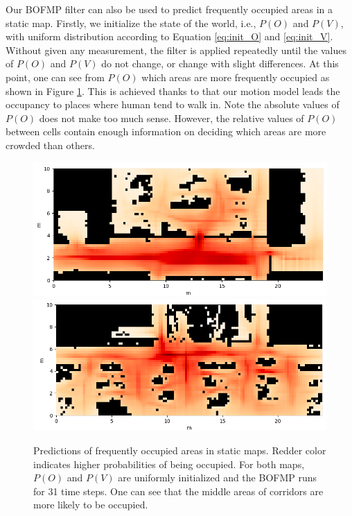 Our BOFMP filter can also be used to predict frequently occupied areas in a static map. Firstly, we initialize the state of the world, i.e., $P(O)$ and $P(V)$, with uniform distribution according to Equation \ref{eq:init_O} and \ref{eq:init_V}. Without given any measurement, the filter is applied repeatedly until the values of $P(O)$ and $P(V)$ do not change, or change with slight differences. At this point, one can see from $P(O)$ which areas are more frequently occupied as shown in Figure \ref{fig:average_occupancy_pred}. This is achieved thanks to that our motion model leads the occupancy to places where human tend to walk in. Note the absolute values of $P(O)$ does not make too much sense. However, the relative values of $P(O)$ between cells contain enough information on deciding which areas are more crowded than others. 

\begin{figure}[ht]
  \centering
    \includegraphics[width=\textwidth]{figures/average_occupancy_3.png} \\
    \includegraphics[width=\textwidth]{figures/average_occupancy_4.png} \\
    \caption[Predictions of frequently occupied areas in static maps.]{Predictions of frequently occupied areas in static maps. Redder color indicates higher probabilities of being occupied. For both maps, $P(O)$ and $P(V)$ are uniformly initialized and the BOFMP runs for 31 time steps. One can see that the middle areas of corridors are more likely to be occupied.} 
    \label{fig:average_occupancy_pred}
\end{figure}


 